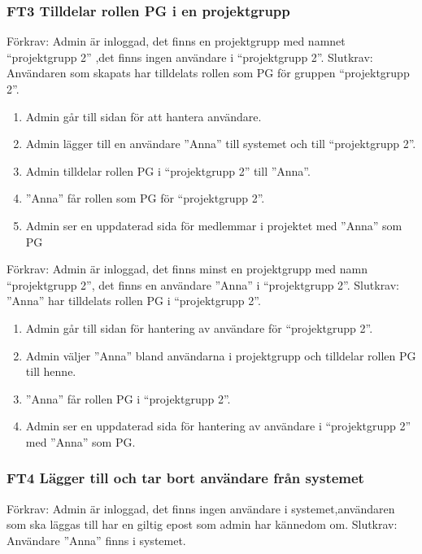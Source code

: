 \documentclass[paper=a4, fontsize=11pt,twoside]{article}
\begin{document}
\subsubsection*{FT3 Tilldelar rollen PG i en projektgrupp}
	Förkrav: Admin är inloggad, det finns en projektgrupp med namnet “projektgrupp 2” ,det finns ingen användare i “projektgrupp 2”.
	\newline
	Slutkrav:  Användaren som skapats har tilldelats rollen som PG för gruppen
	“projektgrupp 2”.
	
	\begin{enumerate}
		\item Admin går till sidan för att hantera användare.
		\item Admin lägger till en användare ”Anna” till systemet och till “projektgrupp 2”.
		\item Admin tilldelar rollen PG i “projektgrupp 2” till ”Anna”.
		\item ”Anna” får rollen som PG för “projektgrupp 2”.
		\item Admin ser en uppdaterad sida för medlemmar i projektet med ”Anna” som PG
	\end{enumerate}
	
	Förkrav: Admin är inloggad, det finns minst en projektgrupp med namn
	“projektgrupp 2”, det finns en användare ”Anna” i “projektgrupp 2”.
	\newline
	Slutkrav: ”Anna” har tilldelats rollen PG i “projektgrupp 2”.
 	
 	\begin{enumerate}
	\item Admin går till sidan för hantering av användare för “projektgrupp 2”.
	\item Admin väljer ”Anna” bland användarna i projektgrupp  och tilldelar rollen
	PG till henne.
	\item ”Anna” får rollen PG i “projektgrupp 2”.
	\item Admin ser en uppdaterad sida för hantering av användare i “projektgrupp 2” med ”Anna” som PG.
		
	\end{enumerate}
	
	\subsubsection*{FT4 Lägger till och tar bort användare från systemet}
	
	Förkrav: Admin är inloggad, det finns ingen användare i systemet,användaren som
	ska läggas till har en giltig epost som admin har kännedom om.
	\newline
	Slutkrav: Användare ”Anna” finns i systemet.
	
\end{document}
